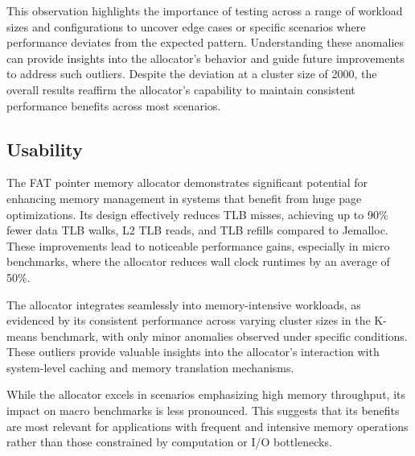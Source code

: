 \documentclass[11pt]{article}
\begin{document}
This observation highlights the importance of testing across a range of workload sizes and 
configurations to uncover edge cases or specific scenarios where performance deviates from the 
expected pattern. Understanding these anomalies can provide insights into the allocator's 
behavior and guide future improvements to address such outliers. Despite the deviation at a 
cluster size of 2000, the overall results reaffirm the allocator's capability to maintain 
consistent performance benefits across most scenarios.
\subsection{Usability}
\label{sec:orgd6ba6f0}
The FAT pointer memory allocator demonstrates significant potential for enhancing 
memory management in systems that benefit from huge page optimizations. Its design 
effectively reduces TLB misses, achieving up to 90\% fewer data TLB walks, L2 TLB reads, 
and TLB refills compared to Jemalloc. These improvements lead to noticeable performance 
gains, especially in micro benchmarks, where the allocator reduces wall clock runtimes 
by an average of 50\%.

The allocator integrates seamlessly into memory-intensive workloads, as evidenced by its 
consistent performance across varying cluster sizes in the K-means benchmark, with only 
minor anomalies observed under specific conditions. These outliers provide valuable 
insights into the allocator's interaction with system-level caching and memory translation mechanisms.

While the allocator excels in scenarios emphasizing high memory throughput, its impact on 
macro benchmarks is less pronounced. This suggests that its benefits are most relevant for 
applications with frequent and intensive memory operations rather than those constrained by 
computation or I/O bottlenecks.



\end{document}
